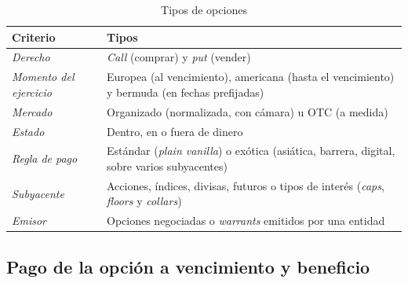 \documentclass[11pt]{article}
\begin{document}
\begin{table}[tbp]
\centering
\caption{Tipos de opciones}\label{tab:tipos-opciones}
\small
\begin{tabular}{>{\raggedright\arraybackslash}m{4.2cm}>{\raggedright\arraybackslash}m{10cm}}
\toprule
\rowcolor{tceeazulpalido}\textbf{Criterio} & \textbf{Tipos}\\
\midrule
\emph{Derecho} & \textcolor{tceeverde}{\emph{Call}} (comprar) y \textcolor{tceedorado}{\emph{put}} (vender)\\
\addlinespace[0.2em]
\emph{Momento del ejercicio} & Europea (al vencimiento), americana (hasta el vencimiento) y bermuda (en fechas prefijadas)\\
\addlinespace[0.2em]
\emph{Mercado} & Organizado (normalizada, con cámara) u OTC (a medida)\\
\addlinespace[0.2em]
\emph{Estado} & Dentro, en o fuera de dinero\\
\addlinespace[0.2em]
\emph{Regla de pago} & Estándar (\emph{plain vanilla}) o exótica (asiática, barrera, digital, sobre varios subyacentes)\\
\addlinespace[0.2em]
\emph{Subyacente} & Acciones, índices, divisas, futuros o tipos de interés (\emph{caps}, \emph{floors} y \emph{collars})\\
\addlinespace[0.2em]
\emph{Emisor} & Opciones negociadas o \emph{warrants} emitidos por una entidad\\
\bottomrule
\end{tabular}
\end{table}

\subsection{Pago de la opción a vencimiento y beneficio}\label{sec:pago-opciones}
\end{document}
